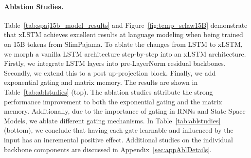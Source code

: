 \documentclass[dvipsnames]{article}
\begin{document}
\paragraph{Ablation Studies.}
Table~\ref{tab:spaj15b_model_results} and Figure~\ref{fig:temp_sclaw15B} demonstrate that
xLSTM achieves excellent results at language modeling
when being trained on 15B tokens from SlimPajama.
To ablate the changes from
LSTM to xLSTM, we morph a vanilla LSTM architecture step-by-step into an xLSTM architecture.
Firstly, we integrate LSTM layers into pre-LayerNorm residual backbones. Secondly, we extend this to a post up-projection block. Finally, we add exponential gating and matrix memory. 
The results are shown in Table~\ref{tab:ablstudies} (top). 
The ablation studies attribute the strong performance improvement
to both the exponential gating and the matrix memory. Additionally, due to the importance of gating in
RNNs and State Space Models, we ablate different gating mechanisms.
In Table~\ref{tab:ablstudies} (bottom), we conclude that having each gate learnable and 
influenced by the input has an incremental positive effect. Additional 
studies on the individual backbone components are discussed in Appendix~\ref{sec:appAblDetails}.
\end{document}
